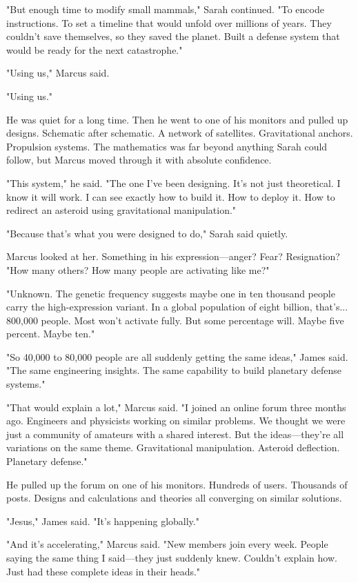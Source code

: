 "But enough time to modify small mammals," Sarah continued. "To encode instructions. To set a timeline that would unfold over millions of years. They couldn't save themselves, so they saved the planet. Built a defense system that would be ready for the next catastrophe."

"Using us," Marcus said.

"Using us."

He was quiet for a long time. Then he went to one of his monitors and pulled up designs. Schematic after schematic. A network of satellites. Gravitational anchors. Propulsion systems. The mathematics was far beyond anything Sarah could follow, but Marcus moved through it with absolute confidence.

"This system," he said. "The one I've been designing. It's not just theoretical. I know it will work. I can see exactly how to build it. How to deploy it. How to redirect an asteroid using gravitational manipulation."

"Because that's what you were designed to do," Sarah said quietly.

Marcus looked at her. Something in his expression—anger? Fear? Resignation? "How many others? How many people are activating like me?"

"Unknown. The genetic frequency suggests maybe one in ten thousand people carry the high-expression variant. In a global population of eight billion, that's... 800,000 people. Most won't activate fully. But some percentage will. Maybe five percent. Maybe ten."

"So 40,000 to 80,000 people are all suddenly getting the same ideas," James said. "The same engineering insights. The same capability to build planetary defense systems."

"That would explain a lot," Marcus said. "I joined an online forum three months ago. Engineers and physicists working on similar problems. We thought we were just a community of amateurs with a shared interest. But the ideas—they're all variations on the same theme. Gravitational manipulation. Asteroid deflection. Planetary defense."

He pulled up the forum on one of his monitors. Hundreds of users. Thousands of posts. Designs and calculations and theories all converging on similar solutions.

"Jesus," James said. "It's happening globally."

"And it's accelerating," Marcus said. "New members join every week. People saying the same thing I said—they just suddenly knew. Couldn't explain how. Just had these complete ideas in their heads."

